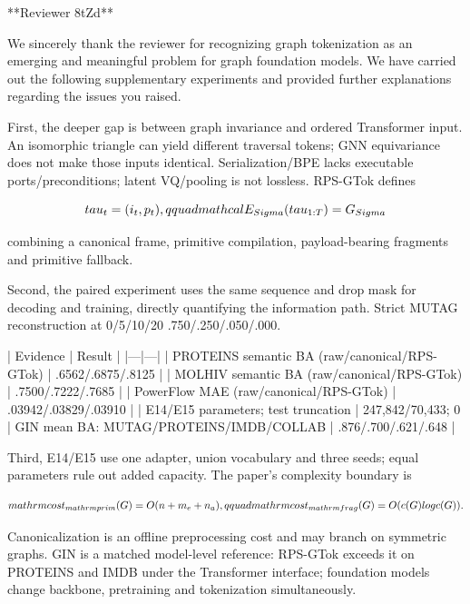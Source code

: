 **Reviewer 8tZd**

We sincerely thank the reviewer for recognizing graph tokenization as an
emerging and meaningful problem for graph foundation models. We have carried
out the following supplementary experiments and provided further explanations
regarding the issues you raised.

First, the deeper gap is between graph invariance and ordered Transformer input.
An isomorphic triangle can yield different traversal tokens; GNN equivariance
does not make those inputs identical. Serialization/BPE lacks executable
ports/preconditions; latent VQ/pooling is not lossless. RPS-GTok defines

$$
\\tau_t=(i_t,p_t),\\qquad
\\mathcal{E}_{\\Sigma}(\\tau_{1:T})=G_{\\Sigma}
$$

combining a canonical frame,
primitive compilation, payload-bearing fragments and primitive fallback.

Second, the paired experiment uses the same sequence and drop mask for decoding
and training, directly quantifying the information path. Strict MUTAG
reconstruction at 0/5/10/20%
.750/.250/.050/.000.

| Evidence | Result |
|---|---|
| PROTEINS semantic BA (raw/canonical/RPS-GTok) | .6562/.6875/.8125 |
| MOLHIV semantic BA (raw/canonical/RPS-GTok) | .7500/.7222/.7685 |
| PowerFlow MAE (raw/canonical/RPS-GTok) | .03942/.03829/.03910 |
| E14/E15 parameters; test truncation | 247,842/70,433; 0%
| GIN mean BA: MUTAG/PROTEINS/IMDB/COLLAB | .876/.700/.621/.648 |

Third, E14/E15 use one adapter, union vocabulary and three seeds; equal
parameters rule out added capacity. The paper's complexity boundary is

$$
\\mathrm{cost}_{\\mathrm{prim}}(G)=O(n+m_e+n_a),\\qquad
\\mathrm{cost}_{\\mathrm{frag}}(G)=O(c(G)\\log c(G)).
$$

Canonicalization is an offline preprocessing cost and may branch on symmetric graphs. GIN is a matched
model-level reference: RPS-GTok exceeds it on PROTEINS and IMDB under the
Transformer interface; foundation models change backbone, pretraining and
tokenization simultaneously.

